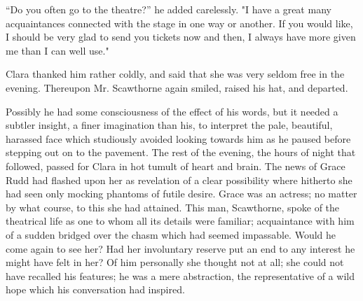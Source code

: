 ``Do you often go to the theatre?'' he added carelessly. "I have a great
many acquaintances connected with the stage in one way or another. If
you would like, I should be {\protect\hypertarget{207}{}{}}very glad to
send you tickets now and then, I always have more given me than I can
well use."

Clara thanked him rather coldly, and said that she was very seldom free
in the evening. Thereupon Mr. Scawthorne again smiled, raised his hat,
and departed.

Possibly he had some consciousness of the effect of his words, but it
needed a subtler insight, a finer imagination than his, to interpret the
pale, beautiful, harassed face which studiously avoided looking towards
him as he paused before stepping out on to the pavement. The rest of the
evening, the hours of night that followed, passed for Clara in hot
tumult of heart and brain. The news of Grace Rudd had flashed upon her
as revelation of a clear possibility where hitherto she had seen only
mocking phantoms of futile desire. Grace was an actress; no matter by
what course, to this she had attained. This man, Scawthorne, spoke of
the theatrical life as one to whom all its details were familiar;
acquaintance with him of a sudden bridged over the
{\protect\hypertarget{208}{}{}}chasm which had seemed impassable. Would
he come again to see her? Had her involuntary reserve put an end to any
interest he might have felt in her? Of him personally she thought not at
all; she could not have recalled his features; he was a mere
abstraction, the representative of a wild hope which his conversation
had inspired.

